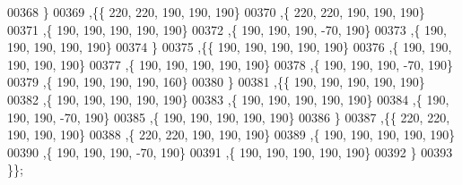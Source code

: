 \begin{DoxyCode}
00368   \}
00369  ,\{\{   220,   220,   190,   190,   190\}
00370   ,\{   220,   220,   190,   190,   190\}
00371   ,\{   190,   190,   190,   190,   190\}
00372   ,\{   190,   190,   190,   -70,   190\}
00373   ,\{   190,   190,   190,   190,   190\}
00374   \}
00375  ,\{\{   190,   190,   190,   190,   190\}
00376   ,\{   190,   190,   190,   190,   190\}
00377   ,\{   190,   190,   190,   190,   190\}
00378   ,\{   190,   190,   190,   -70,   190\}
00379   ,\{   190,   190,   190,   190,   160\}
00380   \}
00381  ,\{\{   190,   190,   190,   190,   190\}
00382   ,\{   190,   190,   190,   190,   190\}
00383   ,\{   190,   190,   190,   190,   190\}
00384   ,\{   190,   190,   190,   -70,   190\}
00385   ,\{   190,   190,   190,   190,   190\}
00386   \}
00387  ,\{\{   220,   220,   190,   190,   190\}
00388   ,\{   220,   220,   190,   190,   190\}
00389   ,\{   190,   190,   190,   190,   190\}
00390   ,\{   190,   190,   190,   -70,   190\}
00391   ,\{   190,   190,   190,   190,   190\}
00392   \}
00393  \}\};
\end{DoxyCode}
